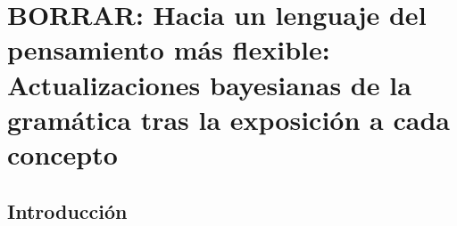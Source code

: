 

\chapter{BORRAR: Hacia un lenguaje del pensamiento más flexible: Actualizaciones bayesianas de la gramática tras la exposición a cada concepto}

\section{Introducción}


